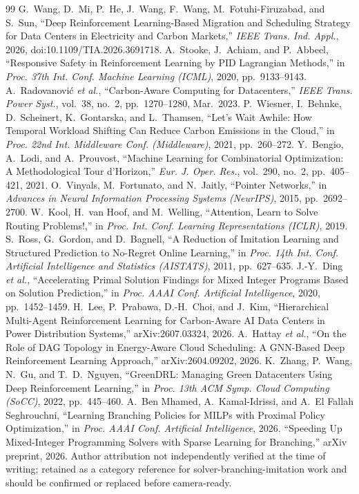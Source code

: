 \documentclass[journal]{IEEEtran}
\begin{document}
\begin{thebibliography}{99}
 G.~Wang, D.~Mi, P.~He, J.~Wang, F.~Wang, M.~Fotuhi-Firuzabad, and S.~Sun, ``Deep Reinforcement Learning-Based Migration and Scheduling Strategy for Data Centers in Electricity and Carbon Markets,'' \textit{IEEE Trans. Ind. Appl.}, 2026, doi:10.1109/TIA.2026.3691718.
 A.~Stooke, J.~Achiam, and P.~Abbeel, ``Responsive Safety in Reinforcement Learning by PID Lagrangian Methods,'' in \textit{Proc. 37th Int. Conf. Machine Learning (ICML)}, 2020, pp.~9133--9143.
 A.~Radovanovi\'{c} \textit{et al.}, ``Carbon-Aware Computing for Datacenters,'' \textit{IEEE Trans. Power Syst.}, vol.~38, no.~2, pp.~1270--1280, Mar.~2023.
 P.~Wiesner, I.~Behnke, D.~Scheinert, K.~Gontarska, and L.~Thamsen, ``Let's Wait Awhile: How Temporal Workload Shifting Can Reduce Carbon Emissions in the Cloud,'' in \textit{Proc. 22nd Int. Middleware Conf. (Middleware)}, 2021, pp.~260--272.
 Y.~Bengio, A.~Lodi, and A.~Prouvost, ``Machine Learning for Combinatorial Optimization: A Methodological Tour d'Horizon,'' \textit{Eur. J. Oper. Res.}, vol.~290, no.~2, pp.~405--421, 2021.
 O.~Vinyals, M.~Fortunato, and N.~Jaitly, ``Pointer Networks,'' in \textit{Advances in Neural Information Processing Systems (NeurIPS)}, 2015, pp.~2692--2700.
 W.~Kool, H.~van Hoof, and M.~Welling, ``Attention, Learn to Solve Routing Problems!,'' in \textit{Proc. Int. Conf. Learning Representations (ICLR)}, 2019.
 S.~Ross, G.~Gordon, and D.~Bagnell, ``A Reduction of Imitation Learning and Structured Prediction to No-Regret Online Learning,'' in \textit{Proc. 14th Int. Conf. Artificial Intelligence and Statistics (AISTATS)}, 2011, pp.~627--635.
 J.-Y.~Ding \textit{et al.}, ``Accelerating Primal Solution Findings for Mixed Integer Programs Based on Solution Prediction,'' in \textit{Proc. AAAI Conf. Artificial Intelligence}, 2020, pp.~1452--1459.
 H.~Lee, P.~Prabawa, D.-H.~Choi, and J.~Kim, ``Hierarchical Multi-Agent Reinforcement Learning for Carbon-Aware AI Data Centers in Power Distribution Systems,'' arXiv:2607.03324, 2026.
 A.~Hattay \textit{et al.}, ``On the Role of DAG Topology in Energy-Aware Cloud Scheduling: A GNN-Based Deep Reinforcement Learning Approach,'' arXiv:2604.09202, 2026.
 K.~Zhang, P.~Wang, N.~Gu, and T.~D.~Nguyen, ``GreenDRL: Managing Green Datacenters Using Deep Reinforcement Learning,'' in \textit{Proc. 13th ACM Symp. Cloud Computing (SoCC)}, 2022, pp.~445--460.
 A.~Ben Mhamed, A.~Kamal-Idrissi, and A.~El Fallah Seghrouchni, ``Learning Branching Policies for MILPs with Proximal Policy Optimization,'' in \textit{Proc. AAAI Conf. Artificial Intelligence}, 2026.
 ``Speeding Up Mixed-Integer Programming Solvers with Sparse Learning for Branching,'' arXiv preprint, 2026. Author attribution not independently verified at the time of writing; retained as a category reference for solver-branching-imitation work and should be confirmed or replaced before camera-ready.
\end{thebibliography}
\end{document}
